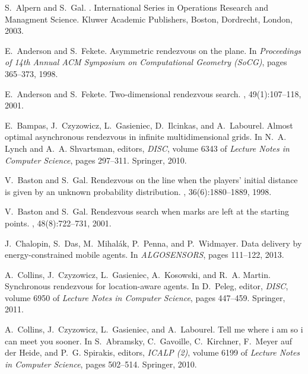 \documentclass{llncs}
\begin{document}
\begin{thebibliography}{10}

S.~Alpern and S.~Gal.
.
\newblock International Series in Operations Research and Managment Science.
  Kluwer Academic Publishers, Boston, Dordrecht, London, 2003.

E.~Anderson and S.~Fekete.
\newblock Asymmetric rendezvous on the plane.
\newblock In {\em Proceedings of 14th Annual ACM Symposium on Computational
  Geometry (SoCG)}, pages 365--373, 1998.

E.~Anderson and S.~Fekete.
\newblock Two-dimensional rendezvous search.
, 49(1):107--118, 2001.

E.~Bampas, J.~Czyzowicz, L.~Gasieniec, D.~Ilcinkas, and A.~Labourel.
\newblock Almost optimal asynchronous rendezvous in infinite multidimensional
  grids.
\newblock In N.~A. Lynch and A.~A. Shvartsman, editors, {\em DISC}, volume 6343
  of {\em Lecture Notes in Computer Science}, pages 297--311. Springer, 2010.

V.~Baston and S.~Gal.
\newblock Rendezvous on the line when the players' initial distance is given by
  an unknown probability distribution.
, 36(6):1880--1889,
  1998.

V.~Baston and S.~Gal.
\newblock Rendezvous search when marks are left at the starting points.
, 48(8):722--731, 2001.

J.~Chalopin, S.~Das, M.~Mihal{\'a}k, P.~Penna, and P.~Widmayer.
\newblock Data delivery by energy-constrained mobile agents.
\newblock In {\em ALGOSENSORS}, pages 111--122, 2013.

A.~Collins, J.~Czyzowicz, L.~Gasieniec, A.~Kosowski, and R.~A. Martin.
\newblock Synchronous rendezvous for location-aware agents.
\newblock In D.~Peleg, editor, {\em DISC}, volume 6950 of {\em Lecture Notes in
  Computer Science}, pages 447--459. Springer, 2011.

A.~Collins, J.~Czyzowicz, L.~Gasieniec, and A.~Labourel.
\newblock Tell me where i am so i can meet you sooner.
\newblock In S.~Abramsky, C.~Gavoille, C.~Kirchner, F.~{Meyer auf der Heide},
  and P.~G. Spirakis, editors, {\em ICALP (2)}, volume 6199 of {\em Lecture
  Notes in Computer Science}, pages 502--514. Springer, 2010.


\end{thebibliography}
\end{document}
